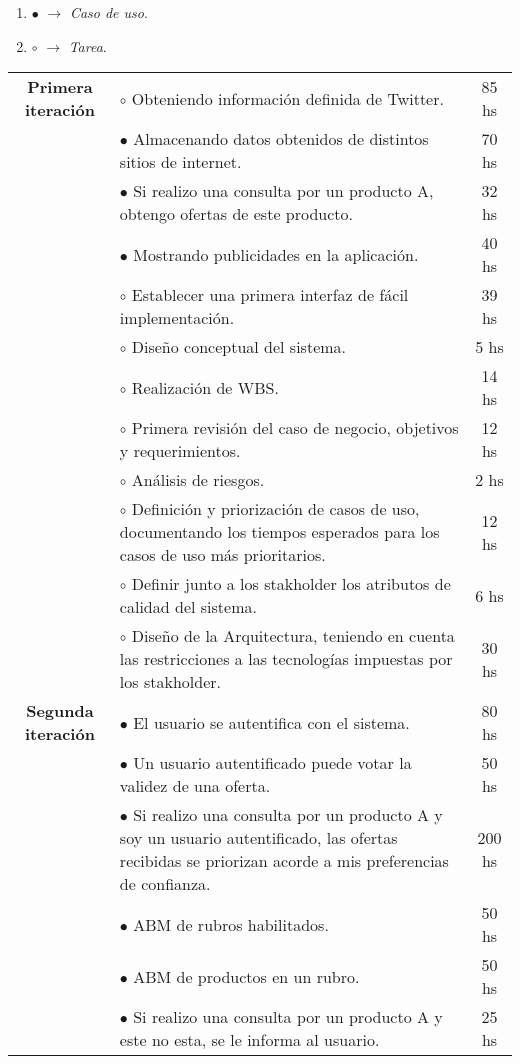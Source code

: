\begin{enumerate}
	\item $\bullet$ $\rightarrow$ \textit{Caso de uso}.
	\item $\circ$ $\rightarrow$ \textit{Tarea}.
\end{enumerate}

\begin{center}
	\begin{tabular}{| c | p{10cm} | c |}
		\hline
		\textbf{Primera iteración}& $\circ$ Obteniendo información definida de Twitter. & 85 hs  \\
								  & $\bullet$ Almacenando datos obtenidos de distintos sitios de internet. & 70 hs \\
								  & $\bullet$ Si realizo una consulta por un producto A, obtengo ofertas de este producto. & 32 hs \\
								  & $\bullet$ Mostrando publicidades en la aplicación. & 40 hs \\
								  & $\circ$ Establecer una primera interfaz de fácil implementación. & 39 hs \\
								  & $\circ$ Diseño conceptual del sistema. & 5 hs \\ 
								  & $\circ$ Realización de WBS. & 14 hs \\
								  & $\circ$ Primera revisión del caso de negocio, objetivos y requerimientos. & 12 hs \\
								  & $\circ$ Análisis de riesgos. & 2 hs \\
								  & $\circ$ Definición y priorización de casos de uso, documentando los tiempos esperados para los casos de uso más prioritarios. & 12 hs \\
								  & $\circ$ Definir junto a los stakholder los atributos de calidad del sistema. & 6 hs \\
								  & $\circ$ Diseño de la Arquitectura, teniendo en cuenta las restricciones a las tecnologías impuestas por los stakholder. & 30 hs \\

		\hline
		\textbf{Segunda iteración}& $\bullet$ El usuario se autentifica con el sistema. & 80 hs \\
								  & $\bullet$ Un usuario autentificado puede votar la validez de una oferta. &  50 hs \\
								  & $\bullet$ Si realizo una consulta por un producto A y soy un usuario autentificado, las ofertas recibidas se priorizan acorde a mis preferencias de confianza. & 200 hs \\
								  & $\bullet$ ABM de rubros habilitados. & 50 hs \\
								  & $\bullet$ ABM de productos en un rubro. & 50 hs \\
								  & $\bullet$ Si realizo una consulta por un producto A y este no esta, se le informa al usuario. & 25 hs \\


\end{tabular}
\end{center}
